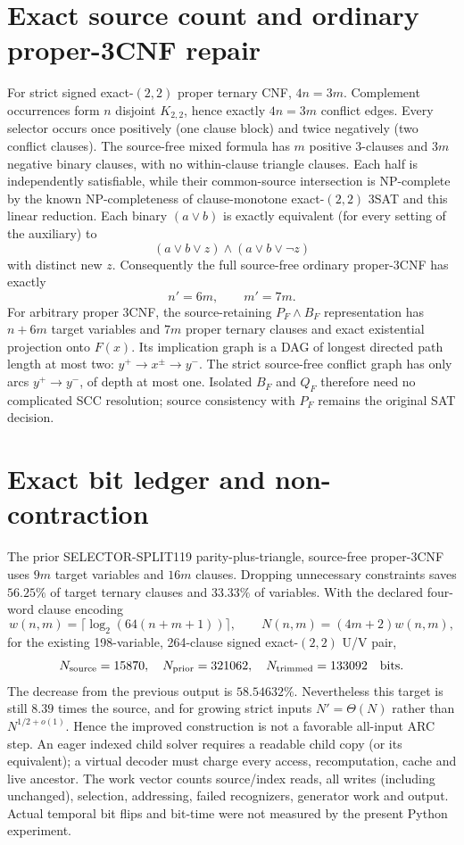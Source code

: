 \documentclass[11pt]{article}
\begin{document}
\section{Exact source count and ordinary proper-3CNF repair}
For strict signed exact-$(2,2)$ proper ternary CNF, $4n=3m$. Complement occurrences form $n$ disjoint $K_{2,2}$, hence exactly $4n=3m$ conflict edges. Every selector occurs once positively (one clause block) and twice negatively (two conflict clauses). The source-free mixed formula has $m$ positive 3-clauses and $3m$ negative binary clauses, with no within-clause triangle clauses. Each half is independently satisfiable, while their common-source intersection is NP-complete by the known NP-completeness of clause-monotone exact-$(2,2)$ 3SAT and this linear reduction.
Each binary $(a\vee b)$ is exactly equivalent (for every setting of the auxiliary) to
\[
(a\vee b\vee z)\land(a\vee b\vee\neg z)
\]
with distinct new $z$. Consequently the full source-free ordinary proper-3CNF has exactly
\[
\boxed{n'=6m,\qquad m'=7m.}
\]
For arbitrary proper 3CNF, the source-retaining $P_F\land B_F$ representation has $n+6m$ target variables and $7m$ proper ternary clauses and exact existential projection onto $F(x)$. Its implication graph is a DAG of longest directed path length at most two: $y^+\to x^\pm\to y^-$. The strict source-free conflict graph has only arcs $y^+\to y^-$, of depth at most one. Isolated $B_F$ and $Q_F$ therefore need no complicated SCC resolution; source consistency with $P_F$ remains the original SAT decision.
\section{Exact bit ledger and non-contraction}
The prior SELECTOR-SPLIT119 parity-plus-triangle, source-free proper-3CNF uses $9m$ target variables and $16m$ clauses. Dropping unnecessary constraints saves $56.25\%$ of target ternary clauses and $33.33\%$ of variables. With the declared four-word clause encoding
\[
 w(n,m)=\lceil\log_2(64(n+m+1))\rceil,\qquad N(n,m)=(4m+2)w(n,m),
\]
for the existing 198-variable, 264-clause signed exact-$(2,2)$ U/V pair,
\[
N_{\rm source}=15870,\quad
N_{\rm prior}=321062,\quad
N_{\rm trimmed}=133092\quad\text{bits}.
\]
The decrease from the previous output is $58.54632\%$. Nevertheless this target is still $8.39$ times the source, and for growing strict inputs $N'=\Theta(N)$ rather than $N^{1/2+o(1)}$. Hence the improved construction is not a favorable all-input ARC step. An eager indexed child solver requires a readable child copy (or its equivalent); a virtual decoder must charge every access, recomputation, cache and live ancestor. The work vector counts source/index reads, all writes (including unchanged), selection, addressing, failed recognizers, generator work and output. Actual temporal bit flips and bit-time were not measured by the present Python experiment.
\end{document}
